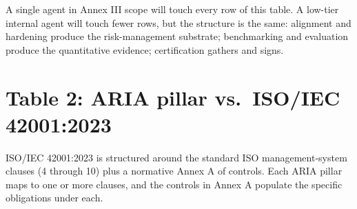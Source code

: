A single agent in Annex III scope will touch every row of this table. A low-tier internal agent will touch fewer rows, but the structure is the same: alignment and hardening produce the risk-management substrate; benchmarking and evaluation produce the quantitative evidence; certification gathers and signs.
\stoptwocol

\TNrule

\section*{Table 2: ARIA pillar vs.\ ISO/IEC 42001:2023}

\starttwocol
ISO/IEC 42001:2023 is structured around the standard ISO management-system clauses (4 through 10) plus a normative Annex A of controls. Each ARIA pillar maps to one or more clauses, and the controls in Annex A populate the specific obligations under each.
